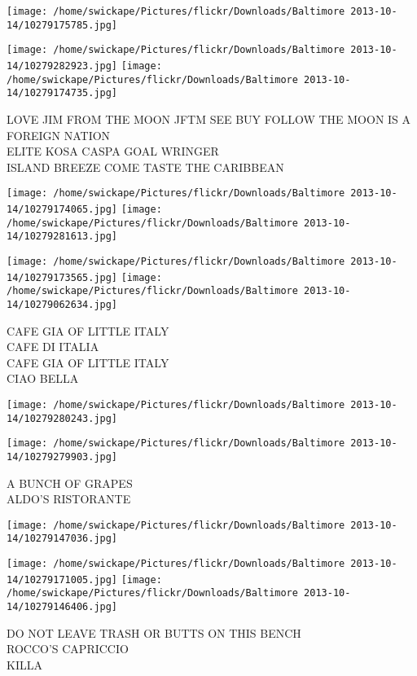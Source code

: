 \documentclass[10pt,letterpaper]{article}
\begin{document}
\texttt{[image: /home/swickape/Pictures/flickr/Downloads/Baltimore 2013-10-14/10279175785.jpg]}

\vspace{0.25in}
\texttt{[image: /home/swickape/Pictures/flickr/Downloads/Baltimore 2013-10-14/10279282923.jpg]}
\texttt{[image: /home/swickape/Pictures/flickr/Downloads/Baltimore 2013-10-14/10279174735.jpg]}

LOVE JIM FROM THE MOON JFTM SEE BUY FOLLOW THE MOON IS A FOREIGN NATION\\
ELITE KOSA CASPA GOAL WRINGER\\
ISLAND BREEZE COME TASTE THE CARIBBEAN
\pagebreak

\texttt{[image: /home/swickape/Pictures/flickr/Downloads/Baltimore 2013-10-14/10279174065.jpg]}
\texttt{[image: /home/swickape/Pictures/flickr/Downloads/Baltimore 2013-10-14/10279281613.jpg]}

\texttt{[image: /home/swickape/Pictures/flickr/Downloads/Baltimore 2013-10-14/10279173565.jpg]}
\texttt{[image: /home/swickape/Pictures/flickr/Downloads/Baltimore 2013-10-14/10279062634.jpg]}

CAFE GIA OF LITTLE ITALY\\
CAFE DI ITALIA\\
CAFE GIA OF LITTLE ITALY\\
CIAO BELLA
\pagebreak

\texttt{[image: /home/swickape/Pictures/flickr/Downloads/Baltimore 2013-10-14/10279280243.jpg]}

\vspace{0.25in}
\texttt{[image: /home/swickape/Pictures/flickr/Downloads/Baltimore 2013-10-14/10279279903.jpg]}

A BUNCH OF GRAPES\\
ALDO'S RISTORANTE
\pagebreak

\texttt{[image: /home/swickape/Pictures/flickr/Downloads/Baltimore 2013-10-14/10279147036.jpg]}

\vspace{0.25in}
\texttt{[image: /home/swickape/Pictures/flickr/Downloads/Baltimore 2013-10-14/10279171005.jpg]}
\texttt{[image: /home/swickape/Pictures/flickr/Downloads/Baltimore 2013-10-14/10279146406.jpg]}

DO NOT LEAVE TRASH OR BUTTS ON THIS BENCH\\
ROCCO'S CAPRICCIO\\
KILLA
\pagebreak
\end{document}
